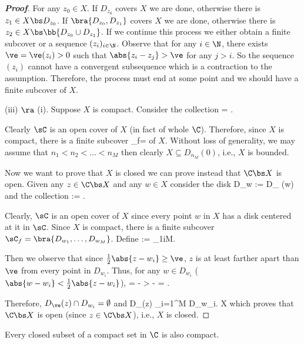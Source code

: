 \begin{proof}[\bf Proof]
For any $z_0\in X$. If $D_{z_0}$ covers $X$ we are done, otherwise there is $z_1\in X\bs D_{z_0}$. If $\bra{D_{z_0},D_{z_1}}$ covers $X$ we are done, otherwise there is $z_2\in X\bs\bb{D_{z_0}\cup D_{z_1}}$. If we continue this process we either obtain a finite subcover or a sequence $(z_i)_{i\in \N}$. Observe that for any $i\in \N$, there exists $\ve = \ve(z_i)>0$ such that $\abs{z_i - z_j}>\ve$ for any $j>i$. So the sequence $(z_i)$ cannot have a convergent subsequence which is a contraction to the assumption. Therefore, the process must end at some point and we should have a finite subcover of $X$.
    
\item [(iii)] $\ra$ (i). Suppose $X$ is compact. Consider the collection
\be
\sC = .
\ee

Clearly $\sC$ is an open cover of $X$ (in fact of whole $\C$). Therefore, since $X$ is compact, there is a finite subcover
\be
\sC_f=  
\ee
of $X$. Without loss of generality, we may assume that $n_1<n_2 < \dots < n_M$ then clearly $X \subseteq D_{n_M}(0)$, i.e., $X$ is bounded.

Now we want to prove that $X$ is closed we can prove instead that $\C\bs X$ is open. Given any $z\in \C\bs X$ and any $w\in X$ consider the disk
\be
D_w := D_{ }(w)
\ee
and the collection 
\be
\sC := .
\ee

Clearly, $\sC$ is an open cover of $X$ since every point $w$ in $X$ has a disk centered at it in $\sC$. Since $X$ is compact, there is a finite subcover $\sC_f = \bra{D_{w_1},\dots,D_{w_M}}$. Define
\be
\ve := \min_{1\leq i\leq M}.
\ee

Then we observe that since $\frac 12 \abs{z - w_i} \geq \ve$, $z$ is at least farther apart than $\ve$ from every point in $D_{w_i}$. Thus, for any $w\in D_{w_i}$ ($\abs{w-w_i} < \frac 12 \abs{z-w_i}$),
\be
{} =  \geq {} -  >  -   =   \geq \ve.
\ee

Therefore, $D_{\ve}(z) \cap D_{w_i}= \emptyset$ and 
\be
D_{\ve}(z) \subseteq \C\left\bs \bigcup_{i=1}^M D_{w_i}\right. \subseteq \C \bs X
\ee
which proves that $\C\bs X$ is open (since $z\in \C\bs X$), i.e., $X$ is closed.
\een
\end{proof}

\begin{proposition}
Every closed subset of a compact set in $\C$ is also compact.
\end{proposition}


